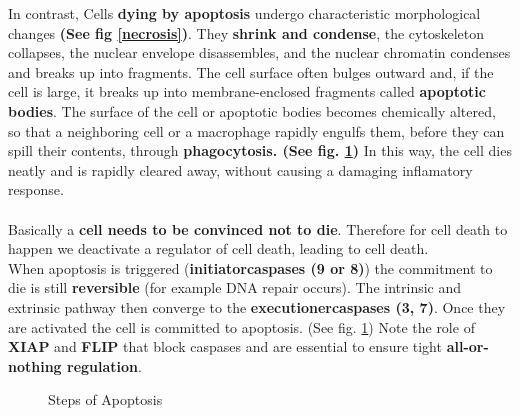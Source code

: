 \documentclass[../main.tex]{subfiles}
\begin{document}
In contrast, Cells \textbf{dying by \gls{apoptosis}} undergo characteristic morphological changes \textbf{(See fig \ref{necrosis})}. They \textbf{shrink and condense}, the cytoskeleton collapses, the nuclear envelope disassembles, and the nuclear chromatin condenses and breaks up into fragments. The cell surface often bulges outward and, if the cell is large, it breaks up into membrane-enclosed fragments called \textbf{apoptotic bodies}. The surface of the cell or apoptotic bodies becomes chemically altered, so that a neighboring cell or a macrophage rapidly engulfs them, before they can spill their contents, through \textbf{phagocytosis. (See fig. \ref{apoptosis-steps})} In this way, the cell dies neatly and is rapidly cleared away, without causing a damaging inflamatory response. \\
\\
\indent Basically a \textbf{cell needs to be convinced not to die}. Therefore for cell death to happen we deactivate a regulator of cell death, leading to cell death. \\
When apoptosis is triggered (\textbf{\gls{initiatorcaspases} (9 or 8)}) the commitment to die is still \textbf{reversible} (for example DNA repair occurs). The intrinsic and extrinsic pathway then converge to the \textbf{\gls{executionercaspases} (3, 7)}. Once they are activated the cell is committed to apoptosis. (See fig. \ref{apoptosis-steps}) Note the role of \textbf{\gls{XIAP}} and \textbf{\gls{FLIP}} that block caspases and are essential to ensure tight \textbf{all-or-nothing regulation}. 
\begin{figure}[H]
	\centering
	\caption{Steps of Apoptosis}
	\label{apoptosis-steps}
\end{figure}
\end{document}
